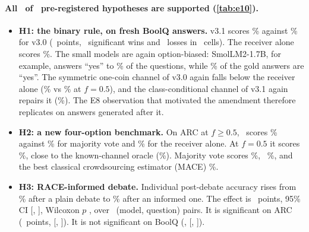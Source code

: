 \paragraph{All \hypSupported\ of \hypTotal\ pre-registered hypotheses are supported (\cref{tab:e10}).}
\begin{itemize}[leftmargin=*,itemsep=1pt]
\item \textbf{H1: the binary rule, on fresh BoolQ answers.} v3.1 scores \hypHOneATarget\% against \hypHOneABase\% for v3.0 (\hypHOneADelta\ points, \hypHOneAWins\ significant wins and \hypHOneALosses\ losses in \hypHOneACells\ cells). The receiver alone scores \hypHOneBBase\%. The small models are again option-biased: SmolLM2-1.7B, for example, answers ``yes'' to \liveTwoSmolYes\% of the questions, while \liveTwoBoolqGoldYes\% of the gold answers are ``yes''. The symmetric one-coin channel of v3.0 again falls below the receiver alone (\liveTwoBoolqLlmVthreeFive\% vs \liveTwoBoolqLlmSelfFive\% at $f=0.5$), and the class-conditional channel of v3.1 again repairs it (\liveTwoBoolqLlmRaceFive\%). The E8 observation that motivated the amendment therefore replicates on answers generated after it.
\item \textbf{H2: a new four-option benchmark.} On ARC at $f\ge0.5$, \race\ scores \hypHTwoATarget\% against \hypHTwoABase\% for majority vote and \hypHTwoBBase\% for the receiver alone. At $f=0.5$ it scores \liveTwoArcLlmRaceFive\%, close to the known-channel oracle (\liveTwoArcLlmOracleFive\%). Majority vote scores \liveTwoArcLlmMajFive\%, \aip\ \liveTwoArcLlmAipFive\%, and the best classical crowdsourcing estimator (MACE) \liveTwoArcLlmMaceFive\%.
\item \textbf{H3: RACE-informed debate.} Individual post-debate accuracy rises from \informedPlain\% after a plain debate to \informedInformed\% after an informed one. The effect is \informedDelta\ points, 95\% CI [\informedCiLow, \informedCiHigh], Wilcoxon $p$ \informedP, over \informedPairs\ (model, question) pairs. It is significant on ARC (\informedArcDelta\ points, [\informedArcCiLow, \informedArcCiHigh]). It is not significant on BoolQ (\informedBoolqDelta, [\informedBoolqCiLow, \informedBoolqCiHigh]).
\end{itemize}

